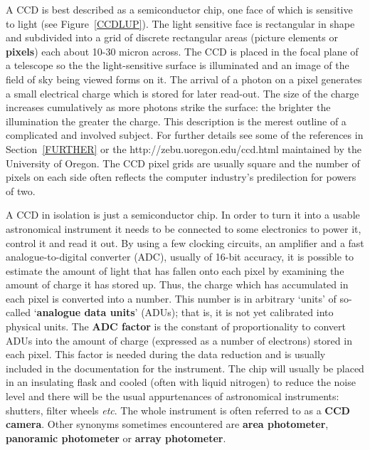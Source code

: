 \documentclass[twoside,11pt]{starlink}
\begin{document}
A CCD is best described as a semiconductor chip, one face of which is
sensitive to light (see Figure~\ref{CCDLUP}).  The light sensitive face is
rectangular in shape and subdivided into a grid of discrete rectangular
areas (picture elements or \textbf{pixels}) each about 10-30 micron across.
The CCD is placed in the focal plane of a telescope so the the
light-sensitive surface is illuminated and an image of the field of sky
being viewed forms on it.  The arrival of a photon on a pixel generates a
small electrical charge which is stored for later read-out.  The size of
the charge increases cumulatively as more photons strike the surface: the
brighter the illumination the greater the charge.
This description is the merest outline of a complicated and involved
subject.  For further details see some of the references in
Section~\ref{FURTHER} or the 
{http://zebu.uoregon.edu/ccd.html} maintained by the University of Oregon.
The CCD pixel grids are usually square and the number of pixels on each
side often reflects the computer industry's predilection for powers of two.

A CCD in isolation is just a semiconductor chip.  In order to turn it
into a usable astronomical instrument it needs to be connected to some
electronics to power it, control it and read it out.  By using a few
clocking circuits, an amplifier and a fast analogue-to-digital converter
(ADC), usually of 16-bit accuracy, it is possible to estimate the amount of
light that has fallen onto each pixel by examining the amount of charge it
has stored up.  Thus, the charge which has accumulated in each pixel is
converted into a number.  This number is in arbitrary `units' of so-called
`\textbf{analogue data units}' (ADUs); that is, it is not yet calibrated into
physical units.  The \textbf{ADC factor} is the constant of proportionality
to convert ADUs into the amount of charge (expressed as a number of
electrons) stored in each pixel.  This factor is needed during the data
reduction and is usually included in the documentation for the instrument.
The chip will usually be placed in an insulating flask and cooled (often
with liquid nitrogen) to reduce the noise level and there will be the usual
appurtenances of astronomical instruments: shutters, filter wheels
\emph{etc}.  The whole instrument is often referred to as a \textbf{CCD camera}.
Other synonyms sometimes encountered are \textbf{area photometer}, \textbf{panoramic photometer} or \textbf{array photometer}.
\end{document}
